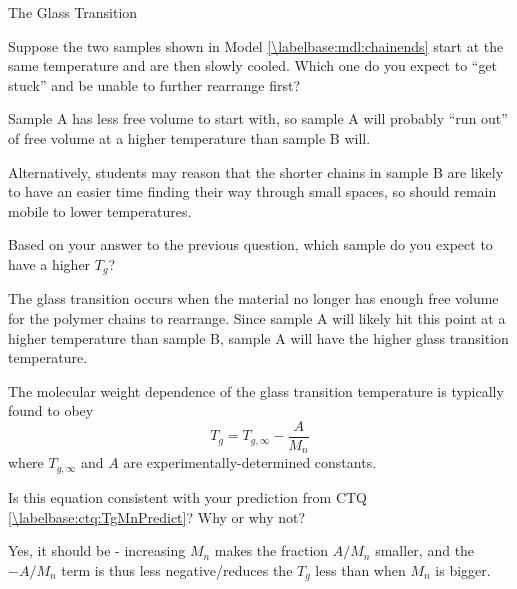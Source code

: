 \begin{activity}{The Glass Transition}
\begin{ctqs}
	\question Suppose the two samples shown in Model \ref{\labelbase:mdl:chainends} start at the same temperature and are then slowly cooled.  Which one do you expect to ``get stuck'' and be unable to further rearrange first? 
	
		\begin{solution}[0.75in]{}
			Sample A has less free volume to start with, so sample A will probably ``run out'' of free volume at a higher temperature than sample B will.
			
			Alternatively, students may reason that the shorter chains in sample B are likely to have an easier time finding their way through small spaces, so should remain mobile to lower temperatures.
		\end{solution}
		
	\question Based on your answer to the previous question, which sample do you expect to have a higher $T_g$?
		 \label{\labelbase:ctq:TgMnPredict}
	
		\begin{solution}[0.75in]{}
			The glass transition occurs when the material no longer has enough free volume for the polymer chains to rearrange.  Since sample A will likely hit this point at a higher temperature than sample B, sample A will have the higher glass transition temperature.
		\end{solution}
	
\end{ctqs}

\begin{infobox}

	The molecular weight dependence of the glass transition temperature is typically found to obey
	\begin{equation*}
		T_g = T_{g,\infty} - \frac{A}{M_n}\label{\labelbase:eqn:Mn}
	\end{equation*}
	where $T_{g,\infty}$ and $A$ are experimentally-determined constants.
\end{infobox}

\begin{ctqs}
	\question Is this equation consistent with your prediction from CTQ \ref{\labelbase:ctq:TgMnPredict}? Why or why not?
	
		\begin{solution}[1in]{}
			Yes, it should be - increasing $M_n$ makes the fraction $A/M_n$ smaller, and the $-A/M_n$ term is thus less negative/reduces the $T_g$ less than when $M_n$ is bigger.
		\end{solution}
	

\end{ctqs}
\end{activity}
